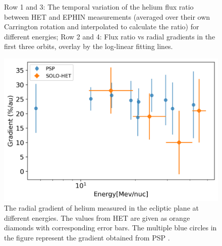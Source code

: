 \begin{figure}[!htb]
    \caption[Ratio of helium intensity between \ac{HET} and \ac{EPHIN} and helium radial grdient in different energy range]{Row 1 and 3: The temporal variation of the helium flux ratio between \ac{HET} and \ac{EPHIN} measurements (averaged over their own Carrington rotation and interpolated to calculate the ratio) for different energies; Row 2 and 4: Flux ratio vs radial gradients in the first three orbits, overlay by the log-linear fitting lines.} 
    \label{fig:ratio_radialgradient}
\end{figure}



\begin{figure}[!htb]
    \centering
    \includegraphics{images/ACR/Energydependent_normal_mask20230612.png}
    \caption[Energy dependency of the helium radial gradient]{The radial gradient of helium measured in the ecliptic plane at different energies. The values from \ac{HET} are given as orange diamonds with corresponding error bars. The multiple blue circles in the figure represent the gradient obtained from \ac{PSP} \citep{Rankin2021ApJ}.}
    \label{fig:comparison_SOLO_PSP}
\end{figure}




